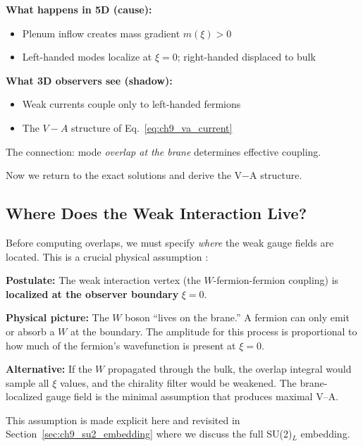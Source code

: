 \begin{tcolorbox}[colback=teal!5!white, colframe=teal!50!black,
    title=\textbf{Projection Reminder}]
\small
\textbf{What happens in 5D (cause):}
\begin{itemize}[nosep]
    \item Plenum inflow creates mass gradient $m(\xi) > 0$
    \item Left-handed modes localize at $\xi = 0$; right-handed displaced to bulk
\end{itemize}
\textbf{What 3D observers see (shadow):}
\begin{itemize}[nosep]
    \item Weak currents couple only to left-handed fermions
    \item The $V{-}A$ structure of Eq.~\eqref{eq:ch9_va_current}
\end{itemize}
The connection: mode \emph{overlap at the brane} determines effective coupling.
\end{tcolorbox}

Now we return to the exact solutions and derive the V$-$A structure.

\subsection{Where Does the Weak Interaction Live?}

Before computing overlaps, we must specify \emph{where} the weak gauge fields
are located. This is a crucial physical assumption \tagP{}:

\begin{tcolorbox}[colback=orange!5, colframe=orange!50!black,
    title=\textbf{Interaction Locality Assumption [P]}]
\textbf{Postulate:} The weak interaction vertex (the $W$-fermion-fermion coupling)
is \textbf{localized at the observer boundary} $\xi = 0$.

\textbf{Physical picture:} The $W$ boson ``lives on the brane.'' A fermion can
only emit or absorb a $W$ at the boundary. The amplitude for this process is
proportional to how much of the fermion's wavefunction is present at $\xi = 0$.

\textbf{Alternative:} If the $W$ propagated through the bulk, the overlap integral
would sample all $\xi$ values, and the chirality filter would be weakened. The
brane-localized gauge field is the minimal assumption that produces maximal V--A.
\end{tcolorbox}

This assumption is made explicit here and revisited in Section~\ref{sec:ch9_su2_embedding}
where we discuss the full SU(2)$_L$ embedding.

